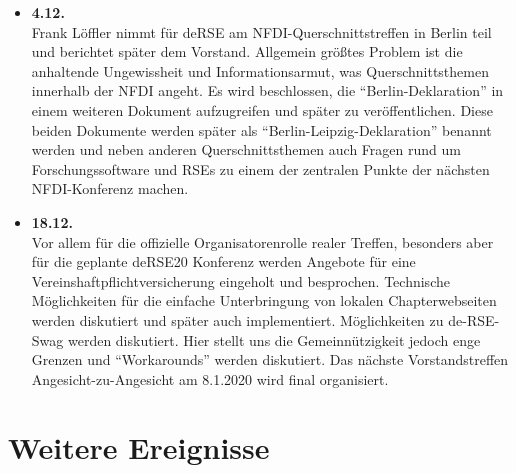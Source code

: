 \begin{itemize}
 \item \textbf{4.12.}\\
 Frank Löffler nimmt für deRSE am NFDI-Querschnittstreffen in Berlin teil und berichtet später dem Vorstand. Allgemein größtes Problem ist die anhaltende Ungewissheit und Informationsarmut, was Querschnittsthemen innerhalb der NFDI angeht. Es wird beschlossen, die "`Berlin-Deklaration"' in einem weiteren Dokument aufzugreifen und später zu veröffentlichen. Diese beiden Dokumente werden später als "`Berlin-Leipzig-Deklaration"' benannt werden und neben anderen Querschnittsthemen auch Fragen rund um Forschungssoftware und RSEs zu einem der zentralen Punkte der nächsten NFDI-Konferenz machen.

 \item \textbf{18.12.}\\
 Vor allem für die offizielle Organisatorenrolle realer Treffen, besonders aber für die geplante deRSE20 Konferenz werden Angebote für eine Vereinshaftpflichtversicherung eingeholt und besprochen. Technische Möglichkeiten für die einfache Unterbringung von lokalen Chapterwebseiten werden diskutiert und später auch implementiert. Möglichkeiten zu de-RSE-Swag werden diskutiert. Hier stellt uns die Gemeinnützigkeit jedoch enge Grenzen und "`Workarounds"' werden diskutiert. Das nächste Vorstandstreffen Angesicht-zu-Angesicht am 8.1.2020 wird final organisiert.

\end{itemize}
\section{Weitere Ereignisse}

